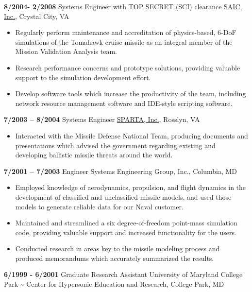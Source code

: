 \documentclass[
  letterpaper,
  DIV=11,
  numbers=noendperiod]{scrartcl}
\providecommand{\tightlist}{%
  \setlength{\itemsep}{0pt}\setlength{\parskip}{0pt}}\usepackage{longtable,booktabs,array}
\begin{document}
\textbf{8/2004- 2/2008} \textbar{} Systems Engineer with TOP SECRET
(SCI) clearance \textbar{} \href{https://www.saic.com/}{SAIC, Inc.},
Crystal City, VA

\begin{itemize}
\tightlist
\item
  Regularly perform maintenance and accreditation of physics-based,
  6-DoF simulations of the Tomahawk cruise missile as an integral member
  of the Mission Validation Analysis team.
\item
  Research performance concerns and prototype solutions, providing
  valuable support to the simulation development effort.
\item
  Develop software tools which increase the productivity of the team,
  including network resource management software and IDE-style scripting
  software.
\end{itemize}

\textbf{7/2003 -- 8/2004} \textbar{} Systems Engineer \textbar{}
\href{https://en.wikipedia.org/wiki/SPARTA,_Inc.}{SPARTA, Inc.},
Rosslyn, VA

\begin{itemize}
\tightlist
\item
  Interacted with the Missile Defense National Team, producing documents
  and presentations which advised the government regarding existing and
  developing ballistic missile threats around the world.
\end{itemize}

\textbf{7/2001 -- 7/2003} \textbar{} Engineer \textbar{} Systems
Engineering Group, Inc., Columbia, MD

\begin{itemize}
\tightlist
\item
  Employed knowledge of aerodynamics, propulsion, and flight dynamics in
  the development of classified and unclassified missile models, and
  used those models to generate reliable data for our Naval customer.
\item
  Maintained and streamlined a six degree-of-freedom point-mass
  simulation code, providing valuable support and increased
  functionality for the users.
\item
  Conducted research in areas key to the missile modeling process and
  produced memorandums which accurately summarized the results.
\end{itemize}

\textbf{6/1999 - 6/2001} \textbar{} Graduate Research Assistant
\textbar{} University of Maryland College Park \textasciitilde{} Center
for Hypersonic Education and Research, College Park, MD
\end{document}
